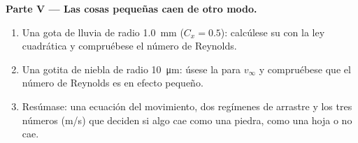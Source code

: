 \begin{problem}
\medskip
\noindent\textbf{Parte V --- Las cosas pequeñas caen de otro modo.}
\begin{enumerate}[resume]
  \item Una gota de lluvia de radio \qty{1.0}{mm} ($C_x = 0.5$):
        calcúlese su  con la ley cuadrática y
        compruébese el número de Reynolds.
  \item Una gotita de niebla de radio \qty{10}{\micro m}: úsese la  para $v_\infty$ y compruébese que el número de Reynolds es
        en efecto pequeño.
  \item Resúmase: una ecuación del movimiento, dos regímenes de arrastre y
        los tres números (\unit{m/s}) que deciden si algo cae como una
        piedra, como una hoja o no cae.
\end{enumerate}
\end{problem}
